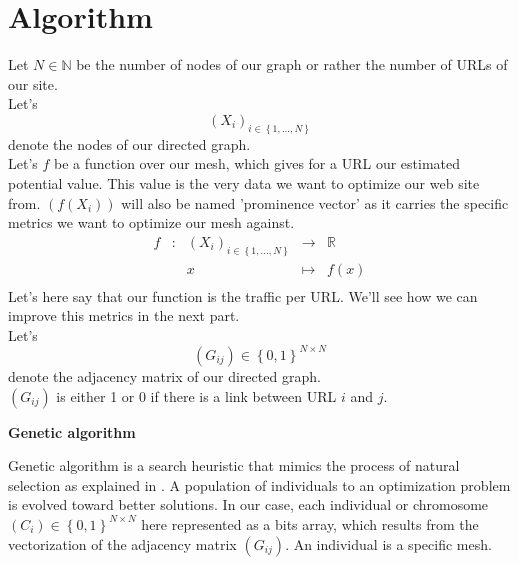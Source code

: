 \documentclass{iSWAGArticle}
\begin{document}
  \section{Algorithm}
  Let $N \in \mathbb{N}$ be the number of nodes of our graph or rather the number of URLs of our site.
  \\\newline
  Let's $$\left(X_i\right)_{i \in \left\{1,...,N\right\}}$$ denote the nodes of our directed graph.
  \\\newline
  Let's $f$ be a function over our mesh, which gives for a URL our estimated potential value. This value is the
  very data we want to optimize our web site from. $\left(f\left(X_i\right)\right)$ will also be named 'prominence vector' as
  it carries the specific metrics we want to optimize our mesh against.
  \begin{equation}
  \begin{array}{ccccc}
  f & : & \left(X_i\right)_{i \in \left\{1,...,N\right\}} & \to & \mathbb{R} \\
  & & x & \mapsto & f(x) \\
  \end{array}
  \end{equation}
  Let's here say that our function is the traffic per URL. We'll see how we can improve this metrics in the next part.
  \\\newline
  Let's $$\left(G_{ij}\right)  \in \left\{0,1\right\}^{N\times N}$$ denote the adjacency matrix of our directed graph.
  \\\newline
  $\left(G_{ij}\right)$ is either 1 or 0 if there is a link between URL $i$ and $j$.
  \begin{center}
  \textbf{\large Genetic algorithm}
  \end{center}
  Genetic algorithm is a search heuristic that mimics the process of natural selection as explained in \cite{gen_algo}. 
  A population of individuals to an optimization problem is evolved toward better solutions. 
  In our case, each individual or chromosome $\left(C_{i}\right)  \in \left\{0,1\right\}^{N\times N}$ here represented as a bits array, which results from the vectorization of
  the adjacency matrix $\left(G_{ij}\right)$. An individual is a specific mesh. 
\end{document}
